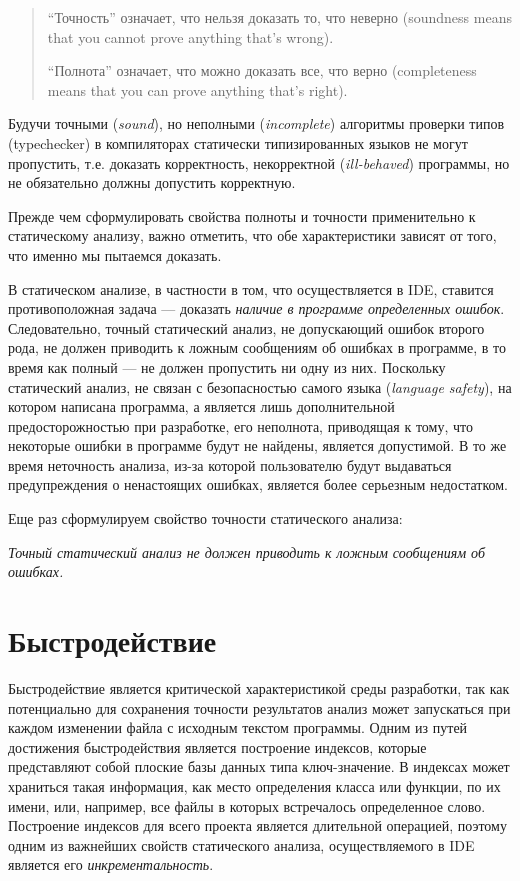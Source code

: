 \begin{quote}
``Точность'' означает, что нельзя доказать то, что неверно (soundness means that
you cannot prove anything that's wrong).

``Полнота'' означает, что можно доказать все, что верно (completeness means that
you can prove anything that's right).
\end{quote}

Будучи точными (\emph{sound}), но неполными (\emph{incomplete}) алгоритмы
проверки типов (typechecker) в компиляторах статически типизированных языков не
могут пропустить, т.е. доказать корректность, некорректной (\emph{ill-behaved})
программы, но не обязательно должны допустить корректную.

Прежде чем сформулировать свойства полноты и точности применительно к
статическому анализу, важно отметить, что обе характеристики зависят от того,
что именно мы пытаемся доказать.

В статическом анализе, в частности в том, что осуществляется в IDE, ставится
противоположная задача --- доказать \emph{наличие в программе определенных
  ошибок}.  Следовательно, точный статический анализ, не допускающий ошибок
второго рода, не должен приводить к ложным сообщениям об ошибках в программе, в
то время как полный --- не должен пропустить ни одну из них. Поскольку
статический анализ, не связан с безопасностью самого языка (\emph{language
  safety}), на котором написана программа, а является лишь дополнительной
предосторожностью при разработке, его неполнота, приводящая к тому, что
некоторые ошибки в программе будут не найдены, является допустимой. В то же
время неточность анализа, из-за которой пользователю будут выдаваться
предупреждения о ненастоящих ошибках, является более серьезным недостатком.

Еще раз сформулируем свойство точности статического анализа:

\emph{Точный статический анализ не должен приводить к ложным сообщениям об 
ошибках.}

\section{Быстродействие}
\label{sec:performance-requirement}

Быстродействие является критической характеристикой среды разработки, так как
потенциально для сохранения точности результатов анализ может запускаться при
каждом изменении файла с исходным текстом программы. Одним из путей достижения
быстродействия является построение индексов, которые представляют собой плоские
базы данных типа ключ-значение. В индексах может храниться такая информация, как
место определения класса или функции, по их имени, или, например, все файлы в
которых встречалось определенное слово. Построение индексов для всего проекта
является длительной операцией, поэтому одним из важнейших свойств статического
анализа, осуществляемого в IDE является его \emph{инкрементальность}.


